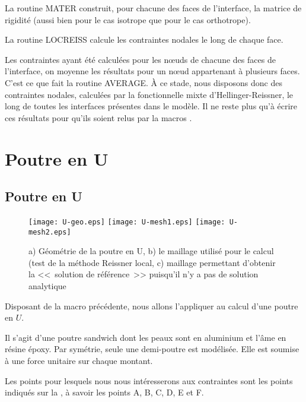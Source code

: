 \medskip
La routine MATER construit, pour chacune des faces de l'interface, la matrice de rigidité (aussi bien pour le cas isotrope
que pour le cas orthotrope).

\medskip
La routine LOCREISS calcule les contraintes nodales le long de chaque face.

\medskip
Les contraintes ayant été calculées pour les nœuds de chacune des faces de l'interface, on moyenne les résultats
pour un nœud appartenant à plusieurs faces. C'est ce que fait la routine AVERAGE. À ce stade, nous disposons donc
des contraintes nodales, calculées par la fonctionnelle mixte d'Hellinger-Reissner, le long de toutes les interfaces présentes
dans le modèle. Il ne reste plus qu'à écrire ces résultats pour qu'ils soient relus par la macros \ansys.










\medskip
\ifVersionAvecExemplesSepares
   \section{Poutre en U}
\else
   \subsection{Poutre en U}
\fi

\begin{figure}[ht]
   \texttt{[image: U-geo.eps]} \hfill
   \texttt{[image: U-mesh1.eps]}\hfill
   \texttt{[image: U-mesh2.eps]}
   \caption{\label{Fig-poutU-geo} a) Géométrie de la poutre en U, b) le maillage utilisé pour le calcul (test de la méthode Reissner local,
c) maillage permettant d'obtenir la <<~solution de référence~>> puisqu'il n'y a pas de solution analytique}
\end{figure}

Disposant de la macro précédente, nous allons l'appliquer au calcul d'une poutre en $U$.

Il s'agit d'une poutre sandwich dont les peaux sont en aluminium et l'âme en résine époxy.
Par symétrie, seule une demi-poutre est modélisée. Elle est soumise à une force unitaire
sur chaque montant.

\medskip
Les points pour lesquels nous nous intéresserons aux contraintes sont les points indiqués sur la
, à savoir les points A, B, C, D, E et F.



